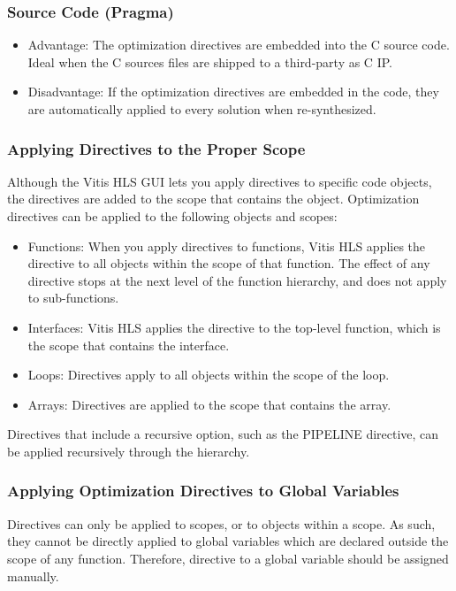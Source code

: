 \subsubsection{Source Code (Pragma)}
\begin{itemize}
  \item Advantage: The optimization directives are embedded into the C source code. Ideal when the C sources files are shipped to a third-party as C IP. 
  \item Disadvantage: If the optimization directives are embedded in the code, they are automatically applied to every solution when re-synthesized.
\end{itemize}

\subsubsection{Applying Directives to the Proper Scope}
Although the Vitis HLS GUI lets you apply directives to specific code objects, the directives are added to the scope that contains the object. Optimization directives can be applied to the following objects and scopes:

\begin{itemize}
  \item Functions: When you apply directives to functions, Vitis HLS applies the directive to all objects within the scope of that function. The effect of any directive stops at the next level of the function hierarchy, and does not apply to sub-functions.
  \item Interfaces: Vitis HLS applies the directive to the top-level function, which is the scope that contains the interface.
  \item Loops: Directives apply to all objects within the scope of the loop.
  \item Arrays: Directives are applied to the scope that contains the array.
\end{itemize}

\begin{highlight}
  Directives that include a recursive option, such as the PIPELINE directive, can be applied recursively through the hierarchy.
\end{highlight}

\subsubsection{Applying Optimization Directives to Global Variables}
Directives can only be applied to scopes, or to objects within a scope. As such, they cannot be directly applied to global variables which are declared outside the scope of any function. Therefore, directive to a global variable should be assigned manually.

